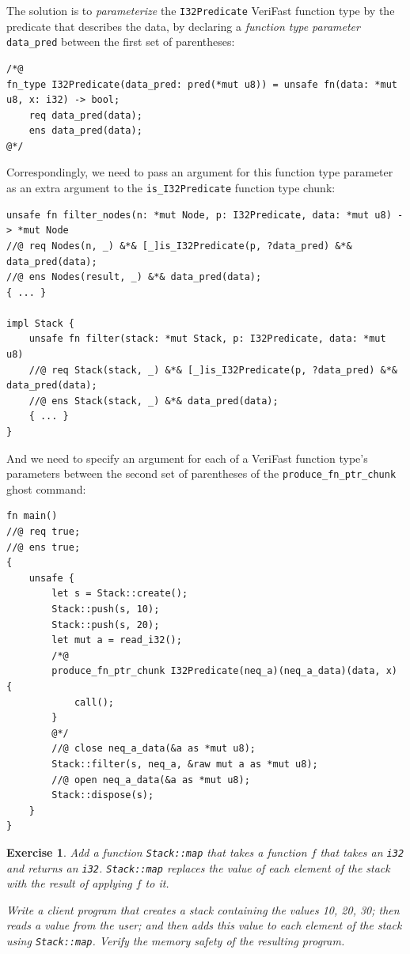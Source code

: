 \documentclass{article}
\newtheorem{exercise}{Exercise}
\begin{document}
The solution is to \emph{parameterize} the \lstinline|I32Predicate| VeriFast function type by the predicate
that describes the data, by declaring a \emph{function type parameter} \lstinline|data_pred| between the first set of parentheses:
\begin{lstlisting}
/*@
fn_type I32Predicate(data_pred: pred(*mut u8)) = unsafe fn(data: *mut u8, x: i32) -> bool;
    req data_pred(data);
    ens data_pred(data);
@*/
\end{lstlisting}
Correspondingly, we need to pass an argument for this function type parameter as an extra argument to the \lstinline|is_I32Predicate| function type chunk:
\begin{lstlisting}
unsafe fn filter_nodes(n: *mut Node, p: I32Predicate, data: *mut u8) -> *mut Node
//@ req Nodes(n, _) &*& [_]is_I32Predicate(p, ?data_pred) &*& data_pred(data);
//@ ens Nodes(result, _) &*& data_pred(data);
{ ... }

impl Stack {
    unsafe fn filter(stack: *mut Stack, p: I32Predicate, data: *mut u8)
    //@ req Stack(stack, _) &*& [_]is_I32Predicate(p, ?data_pred) &*& data_pred(data);
    //@ ens Stack(stack, _) &*& data_pred(data);
    { ... }
}
\end{lstlisting}
And we need to specify an argument for each of a VeriFast function type's parameters between the second set of parentheses of the \lstinline|produce_fn_ptr_chunk| ghost command:
\begin{lstlisting}
fn main()
//@ req true;
//@ ens true;
{
    unsafe {
        let s = Stack::create();
        Stack::push(s, 10);
        Stack::push(s, 20);
        let mut a = read_i32();
        /*@
        produce_fn_ptr_chunk I32Predicate(neq_a)(neq_a_data)(data, x) {
            call();
        }
        @*/
        //@ close neq_a_data(&a as *mut u8);
        Stack::filter(s, neq_a, &raw mut a as *mut u8);
        //@ open neq_a_data(&a as *mut u8);
        Stack::dispose(s);
    }
}
\end{lstlisting}

\begin{exercise}\label{exercise:map}
Add a function \lstinline!Stack::map! that takes a function $f$
that takes an \lstinline|i32| and returns an \lstinline|i32|. \lstinline!Stack::map!
replaces the value of each element of the stack with the result
of applying $f$ to it.

Write a client program that creates a stack containing the
values 10, 20, 30; then reads a value from the user; and then
adds this value to each element of the stack using
\lstinline!Stack::map!. Verify the memory safety of the
resulting program.
\end{exercise}
\end{document}

